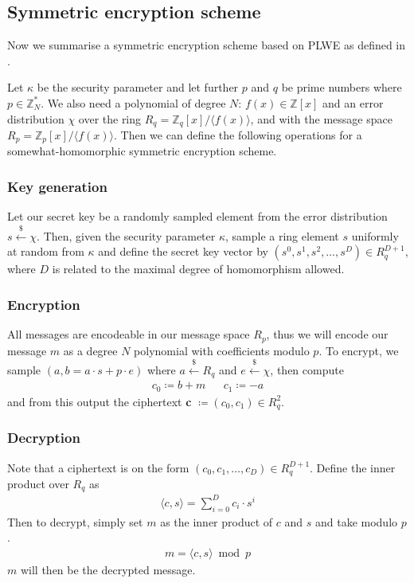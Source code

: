 \documentclass[../main.tex]{subfiles}
\newcommand{\getsrand}{\overset{\$}{\gets}}
\begin{document}
\subsection{Symmetric encryption scheme}

Now we summarise a symmetric encryption scheme based on PLWE as defined in \cite{brakerski2011fully}.

Let $\kappa$ be the security parameter and let further $p$ and $q$ be prime numbers where $p \in \mathbb{Z}_N^*$.
We also need a polynomial of degree $N$: $f(x) \in \mathbb{Z}[x]$ and an error distribution $\chi$ over the ring
$R_q = \mathbb{Z}_q[x] / \langle f(x) \rangle$, and with the message space $R_p = \mathbb{Z}_p[x] / \langle f(x) \rangle$.
Then we can define the following operations for a somewhat-homomorphic symmetric encryption scheme.

\subsubsection{Key generation}
Let our secret key be a randomly sampled element from the error distribution $s \getsrand{} \chi$.
Then, given the security parameter $\kappa$, sample a ring element $s$ uniformly at random from $\kappa$ and define the
secret key vector by $(s^0, s^1, s^2, \dots, s^D) \in R_q^{D+1}$, where $D$ is related to the maximal degree of homomorphism allowed.

\subsubsection{Encryption}
All messages are encodeable in our message space $R_p$, thus we will encode our message $m$ as a degree $N$
polynomial with coefficients modulo $p$.
To encrypt, we sample $(a, b = a \cdot s + p \cdot e)$ where $a \getsrand{} R_q$ and $e \getsrand{} \chi$,
then compute
\begin{align*}
    c_0 \coloneqq b + m &  & c_1 \coloneqq -a
\end{align*}
and from this output the ciphertext \textbf{c} $\coloneqq (c_0, c_1) \in R_q^2$.

\subsubsection{Decryption}
Note that a ciphertext is on the form $(c_0, c_1, \dots , c_D) \in R_q^{D+1}$.
Define the inner product over $R_q$ as
\begin{align*}
    \langle c, s \rangle = \sum_{i=0}^D c_i \cdot s^i
\end{align*}
Then to decrypt, simply set $m$ as the inner product of $c$ and $s$ and take modulo $p$.
\begin{align*}
    m = \langle c, s \rangle \bmod p
\end{align*}
$m$ will then be the decrypted message.
\end{document}
